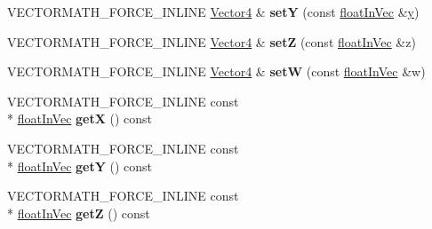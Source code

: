 \begin{DoxyCompactItemize}
\item 
\hypertarget{class_vectormath_1_1_aos_1_1_vector4_ae5aaeab5730f859aec4b6feba86a9aa2}{V\+E\+C\+T\+O\+R\+M\+A\+T\+H\+\_\+\+F\+O\+R\+C\+E\+\_\+\+I\+N\+L\+I\+N\+E \hyperlink{class_vectormath_1_1_aos_1_1_vector4}{Vector4} \& {\bfseries set\+Y} (const \hyperlink{class_vectormath_1_1float_in_vec}{float\+In\+Vec} \&\hyperlink{_ice_utils_8h_aa7ffaed69623192258fb8679569ff9ba}{y})}\label{class_vectormath_1_1_aos_1_1_vector4_ae5aaeab5730f859aec4b6feba86a9aa2}

\item 
\hypertarget{class_vectormath_1_1_aos_1_1_vector4_a456ac2e97da107b64610e5d67d396ef4}{V\+E\+C\+T\+O\+R\+M\+A\+T\+H\+\_\+\+F\+O\+R\+C\+E\+\_\+\+I\+N\+L\+I\+N\+E \hyperlink{class_vectormath_1_1_aos_1_1_vector4}{Vector4} \& {\bfseries set\+Z} (const \hyperlink{class_vectormath_1_1float_in_vec}{float\+In\+Vec} \&z)}\label{class_vectormath_1_1_aos_1_1_vector4_a456ac2e97da107b64610e5d67d396ef4}

\item 
\hypertarget{class_vectormath_1_1_aos_1_1_vector4_afdcf20fe06440b10ff3ec281a212fc1e}{V\+E\+C\+T\+O\+R\+M\+A\+T\+H\+\_\+\+F\+O\+R\+C\+E\+\_\+\+I\+N\+L\+I\+N\+E \hyperlink{class_vectormath_1_1_aos_1_1_vector4}{Vector4} \& {\bfseries set\+W} (const \hyperlink{class_vectormath_1_1float_in_vec}{float\+In\+Vec} \&w)}\label{class_vectormath_1_1_aos_1_1_vector4_afdcf20fe06440b10ff3ec281a212fc1e}

\item 
\hypertarget{class_vectormath_1_1_aos_1_1_vector4_a5d7755096d3effdb3ff1b40de3d3c2c7}{V\+E\+C\+T\+O\+R\+M\+A\+T\+H\+\_\+\+F\+O\+R\+C\+E\+\_\+\+I\+N\+L\+I\+N\+E const \\*
\hyperlink{class_vectormath_1_1float_in_vec}{float\+In\+Vec} {\bfseries get\+X} () const }\label{class_vectormath_1_1_aos_1_1_vector4_a5d7755096d3effdb3ff1b40de3d3c2c7}

\item 
\hypertarget{class_vectormath_1_1_aos_1_1_vector4_a21243d46a7aca7adf8712de7e38b8038}{V\+E\+C\+T\+O\+R\+M\+A\+T\+H\+\_\+\+F\+O\+R\+C\+E\+\_\+\+I\+N\+L\+I\+N\+E const \\*
\hyperlink{class_vectormath_1_1float_in_vec}{float\+In\+Vec} {\bfseries get\+Y} () const }\label{class_vectormath_1_1_aos_1_1_vector4_a21243d46a7aca7adf8712de7e38b8038}

\item 
\hypertarget{class_vectormath_1_1_aos_1_1_vector4_af3933a9f35bea02020e5d5398c29dcb9}{V\+E\+C\+T\+O\+R\+M\+A\+T\+H\+\_\+\+F\+O\+R\+C\+E\+\_\+\+I\+N\+L\+I\+N\+E const \\*
\hyperlink{class_vectormath_1_1float_in_vec}{float\+In\+Vec} {\bfseries get\+Z} () const }\label{class_vectormath_1_1_aos_1_1_vector4_af3933a9f35bea02020e5d5398c29dcb9}


\end{DoxyCompactItemize}
